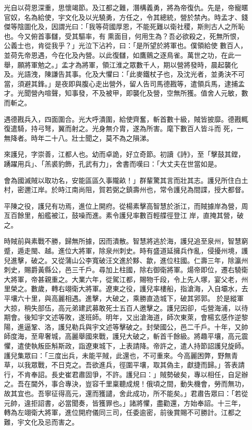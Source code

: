 \begin{pinyinscope}
 光自以荷恩深重，思懷竭節。及江都之難，潛構義勇，將為帝復仇。先是，帝寵暱官奴，名為給使，宇文化及以光驍勇，方任之，令其總統，營於禁內。時孟才、錢傑等陰圖化及，因謂光曰：「我等荷國厚恩，不能死難以衛社稷，斯則古人之所恥也。今又俯首事讎，受其驅率，有熏面目，何用生為？吾必欲殺之，死無所恨，公義士也，肯從我乎？」光泣下沾衿，曰：「是所望於將軍也。僕領給使
 數百人，並荷先帝恩遇，今在化及內營。以此復讎，如鷹鸇之逐鳥雀。萬世之功，在此一舉，願將軍勉之。」孟才為將軍，領江淮之眾數千人，期以營將發時，晨起襲化及。光語洩，陳謙告其事。化及大懼曰：「此麥鐵杖子也，及沈光者，並勇決不可當，須避其鋒。」是夜即與腹心走出營外，留人告司馬德戡等，遣領兵馬，逮捕孟才。光聞營內喧聲，知事發，不及被甲，即襲化及營，空無所獲。值舍人元敏，數而斬之。



 遇德戡兵入，四面圍合。光大呼潰圍，給使齊奮，斬首數十級，賊皆披靡。德戡輒復遣騎，持弓弩，翼而射之。光身無介胄，遂為所害。麾下數百人皆斗而
 死，一無降者。時年二十八。壯士聞之，莫不為之隕涕。



 來護兒，字崇善，江都人也。幼而卓詭，好立奇節。初讀《詩》，至「擊鼓其鏜，踴躍用兵」、「羔裘豹飾，孔武有力」，舍書而嘆曰：「大丈夫在世當如是。



 會為國滅賊以取功名，安能區區久事隴畝！」群輩驚其言而壯其志。護兒所住白土村，密邇江岸。於時江南尚阻，賀若弼之鎮壽州也，常令護兒為間諜，授大都督。



 平陳之役，護兒有功焉，進位上開府。從楊素擊高智慧於浙江，而賊據岸為營，周亙百餘里，船艦被江，鼓噪而進。素令護兒率數百輕艓徑登江
 岸，直掩其營，破之。



 時賊前與素戰不勝，歸無所據，因而潰散。智慧將逃於海，護兒追至泉州，智慧窮蹙，遁走閩、越。進位大將軍，除泉州刺史。時有盛道延擁兵作亂，侵擾州境，護兒進擊，破之。又從蒲山公李寬破汪文進於黟、歙，進位柱國。仁壽三年，除瀛州刺史，賜爵黃縣公，邑三千戶。尋加上柱國，除右御衛將軍。煬帝即位，遷右驍衛大將軍，帝甚親重之。大業六年，從駕江都，賜物千段，令上先人塚，宴父老，州里榮之。數歲，轉右翊衛大將軍。遼東之役，護兒率樓船，指滄海，入自壩水，去平壤六十里，與高麗相遇。進擊，大破之，乘勝直造城下，破其郛郭。
 於是縱軍大掠，稍失部伍，高元弟建武募敢死士五百人邀擊之。護兒因卻，屯營海浦，以待期會。後知宇文述等敗，遂班師。明年，又出滄海道，師次東萊，會楊玄感作逆黎陽，進逼鞏、洛，護兒勒兵與宇文述等擊破之。封榮國公，邑二千戶。十年，又帥師度海，至卑奢城，高麗舉國來戰，護兒大破之，斬首千餘級。將趣平壤，高元震懼，遣使執叛臣斛斯政，詣遼東城下，上表請降。帝許之，遣人持節詔護兒旋師。護兒集眾曰：「三度出兵，未能平賊，此還也，不可重來。今高麗困弊，野無青草，以我眾戰，不日克之。吾欲進兵，徑圍平壤，取其偽主，獻捷而歸。」答表請
 行，不肯奉詔。長史崔君肅固爭，不許。護兒曰：」賊勢破矣，專以相任，自足辦之。吾在閫外，事合專決，豈容千里稟聽成規！俄頃之間，動失機會，勞而無功，故其宜也。吾寧征得高元，還而獲譴，舍此成功，所不能矣。」君肅告眾曰：「若從元帥，違拒詔書，必當聞奏，皆獲罪也。」諸將懼，盡勸還，方始奉詔。十三年，轉為左翊衛大將軍，進位開府儀同三司，任委逾密，前後賞賜不可勝計。江都之難，宇文化及忌而害之。




\end{pinyinscope}
